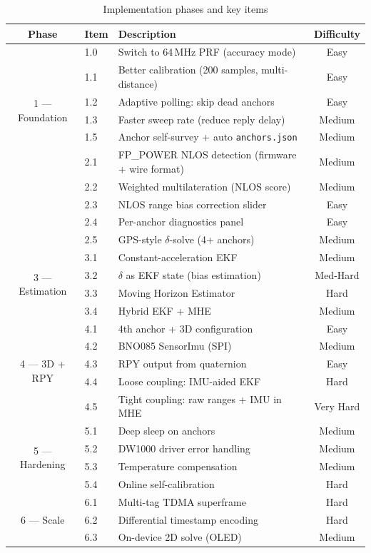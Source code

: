 \documentclass[11pt,a4paper]{article}
\begin{document}
\begin{table}[h!]
\centering
\caption{Implementation phases and key items}
\begin{tabular}{cllc}
\toprule
\textbf{Phase} & \textbf{Item} & \textbf{Description} & \textbf{Difficulty} \\
\midrule
\multirow{6}{*}{1 — Foundation}
 & 1.0 & Switch to 64\,MHz PRF (accuracy mode) & Easy \\
 & 1.1 & Better calibration (200 samples, multi-distance) & Easy \\
 & 1.2 & Adaptive polling: skip dead anchors & Easy \\
 & 1.3 & Faster sweep rate (reduce reply delay) & Medium \\
 & 1.5 & Anchor self-survey + auto \texttt{anchors.json} & Medium \\
\midrule
\multirow{5}{*}{2 — Ranging}
 & 2.1 & FP\_POWER NLOS detection (firmware + wire format) & Medium \\
 & 2.2 & Weighted multilateration (NLOS score) & Medium \\
 & 2.3 & NLOS range bias correction slider & Easy \\
 & 2.4 & Per-anchor diagnostics panel & Easy \\
 & 2.5 & GPS-style $\delta$-solve (4+ anchors) & Medium \\
\midrule
\multirow{4}{*}{3 — Estimation}
 & 3.1 & Constant-acceleration EKF & Medium \\
 & 3.2 & $\delta$ as EKF state (bias estimation) & Med-Hard \\
 & 3.3 & Moving Horizon Estimator & Hard \\
 & 3.4 & Hybrid EKF + MHE & Medium \\
\midrule
\multirow{5}{*}{4 — 3D + RPY}
 & 4.1 & 4th anchor + 3D configuration & Easy \\
 & 4.2 & BNO085 SensorImu (SPI) & Medium \\
 & 4.3 & RPY output from quaternion & Easy \\
 & 4.4 & Loose coupling: IMU-aided EKF & Hard \\
 & 4.5 & Tight coupling: raw ranges + IMU in MHE & Very Hard \\
\midrule
\multirow{4}{*}{5 — Hardening}
 & 5.1 & Deep sleep on anchors & Medium \\
 & 5.2 & DW1000 driver error handling & Medium \\
 & 5.3 & Temperature compensation & Medium \\
 & 5.4 & Online self-calibration & Hard \\
\midrule
\multirow{3}{*}{6 — Scale}
 & 6.1 & Multi-tag TDMA superframe & Hard \\
 & 6.2 & Differential timestamp encoding & Hard \\
 & 6.3 & On-device 2D solve (OLED) & Medium \\
\bottomrule
\end{tabular}
\end{table}
\end{document}
